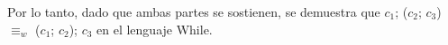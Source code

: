 \documentclass{article}
\begin{document}
\begin{itemize}
\begin{itemize}
            Por lo tanto, dado que ambas partes se sostienen, se demuestra que  $c_1$; ($c_2$; $c_3$) $\equiv_w$ ($c_1$; $c_2$); $c_3$ en el lenguaje While.\\ 
            
        \end{itemize}
    \end{itemize}
\end{document}
